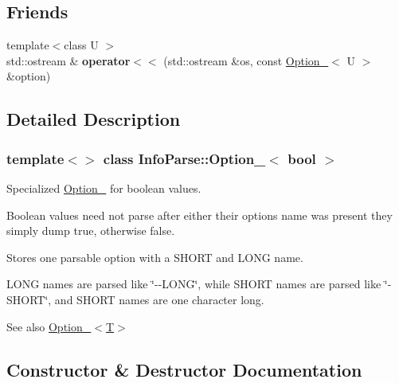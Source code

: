 \subsection*{Friends}
\begin{DoxyCompactItemize}
    \item
    \mbox{\label{class_info_parse_1_1_option___3_01bool_01_4_a90698d256c45cf77c5bcf9120e4d8c5e}}
    {\footnotesize template$<$class U $>$ }\\std\+::ostream \& {\bfseries operator$<$$<$} (std\+::ostream \&os, const \mbox{\hyperlink{class_info_parse_1_1_option__}{Option\+\_\+}}$<$ U $>$ \&option)
\end{DoxyCompactItemize}


\subsection{Detailed Description}
\subsubsection*{template$<$$>$\newline
class Info\+Parse\+::\+Option\+\_\+$<$ bool $>$}

Specialized \mbox{\hyperlink{class_info_parse_1_1_option__}{Option\+\_\+}} for boolean values.

Boolean values need not parse after either their option\textquotesingle{}s name was present they simply dump true, otherwise false.

Stores one parsable option with a S\+H\+O\+RT and L\+O\+NG name.

L\+O\+NG names are parsed like \char`\"{}-\/-\/\+L\+O\+N\+G\char`\"{}, while S\+H\+O\+RT names are parsed like \char`\"{}-\/\+S\+H\+O\+R\+T\char`\"{}, and S\+H\+O\+RT names are one character long.

\begin{DoxySeeAlso}{See also}
    \mbox{\hyperlink{class_info_parse_1_1_option___3_01bool_01_4_add1541692551d1529d8b6f3c9b7791c1}{Option\+\_\+$<$\+T$>$}}
\end{DoxySeeAlso}


\subsection{Constructor \& Destructor Documentation}
\mbox{\label{class_info_parse_1_1_option___3_01bool_01_4_add1541692551d1529d8b6f3c9b7791c1}}
